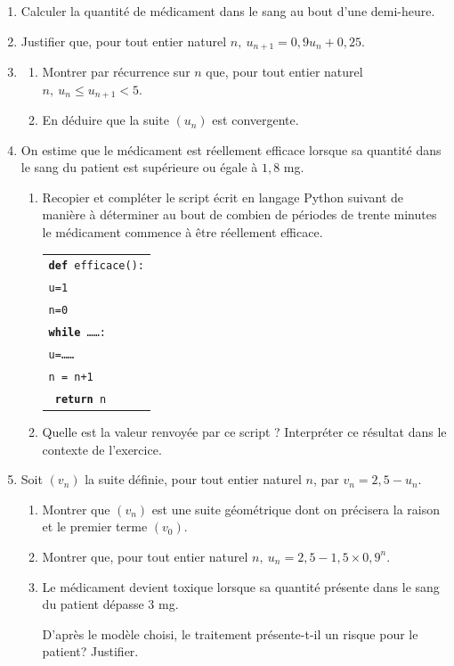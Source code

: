 \documentclass[10pt]{article}
\begin{document}
\begin{enumerate}
\item Calculer la quantité de médicament dans le sang au bout d'une demi-heure.
\item Justifier que, pour tout entier naturel $n,\: u_{n+1} = 0,9u_n + 0,25$.
\item 
	\begin{enumerate}
		\item Montrer par récurrence sur $n$ que, pour tout entier naturel $n,\: u_n \leqslant  u_{n+1} < 5$.
		\item En déduire que la suite $\left(u_n\right)$ est convergente.
	\end{enumerate}
\item On estime que le médicament est réellement efficace lorsque sa quantité dans le sang
du patient est supérieure ou égale à $1,8$ mg.
	\begin{enumerate}
		\item Recopier et compléter le script écrit en langage Python suivant de manière à déterminer au bout de combien de périodes de trente minutes le médicament commence à être réellement efficace.
\begin{center}
\begin{tabular}{|l|}\hline
\texttt{\textbf{def} efficace():}\\
\quad \texttt{u=1}\\
\quad \texttt{n=0}\\
\quad \texttt{\textbf{while} \ldots\ldots :}\\
\quad\qquad \texttt{u=\ldots\ldots}\\
\quad\qquad \texttt{n = n+1}\\
\quad \texttt{\textbf{ return }n}\\ \hline
\end{tabular}
\end{center}

		\item Quelle est la valeur renvoyée par ce script ? Interpréter ce résultat dans le contexte de l'exercice.
	\end{enumerate}		
\item Soit $\left(v_n\right)$ la suite définie, pour tout entier naturel $n$, par $v_n = 2,5 - u_n$.
	\begin{enumerate}
		\item Montrer que $\left(v_n\right)$ est une suite géométrique dont on précisera la raison et le premier terme $\left(v_0\right)$.
		\item Montrer que, pour tout entier naturel $n,\: u_n = 2,5 - 1,5 \times 0,9^n$.
		\item Le médicament devient toxique lorsque sa quantité présente dans le sang du patient dépasse $3$ mg. 
		
D'après le modèle choisi, le traitement présente-t-il un risque pour le patient? Justifier.
	\end{enumerate}
\end{enumerate}
\end{document}
